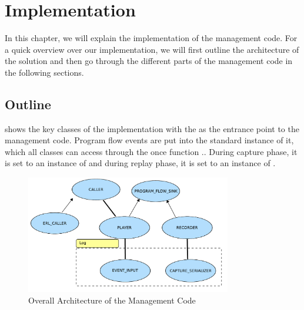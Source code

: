 \section{Implementation}
In this chapter, we will explain the implementation of the management code. For a quick overview over our implementation, we will first outline the architecture of the solution and then go through the different parts of the management code in the following sections.


\subsection{Outline}
  shows the key classes of the implementation with the  as the entrance point to the management code. Program flow events are put into the standard instance of it, which all classes can access through the once function \hspace{0pt}.. During capture phase, it is set to an instance of  and during replay phase, it is set to an instance of .

\begin{figure}[ht]
  \centering
  \includegraphics[width=0.8\textwidth]{illustrations/implementation_overall_architecture}
  \caption{Overall Architecture of the Management Code}
  \label{fig:implementation_overall_architecture}
\end{figure}


